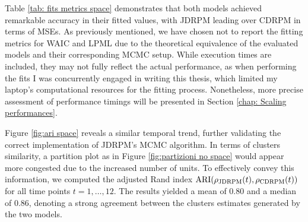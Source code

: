 \documentclass[12pt,	%
	a4paper,		%
	twoside,		%
	openright,		%
	titlepage,%
	]{book}
\theoremstyle{definition}
\begin{document}
Table \ref{tab: fits metrics space} demonstrates that both models achieved remarkable accuracy in their fitted values, with JDRPM leading over CDRPM in terms of MSEs. As previously mentioned, we have chosen not to report the fitting metrics for WAIC and LPML due to the theoretical equivalence of the evaluated models and their corresponding MCMC setup. While execution times are included, they may not fully reflect the actual performance, as when performing the fits I was concurrently engaged in writing this thesis, which limited my laptop's computational resources for the fitting process. Nonetheless, more precise assessment of performance timings will be presented in Section \ref{chap: Scaling performances}.

Figure \ref{fig:ari space} reveals a similar temporal trend, further validating the correct implementation of JDRPM's MCMC algorithm. In terms of clusters similarity, a partition plot as in Figure \ref{fig:partizioni no space} would appear more congested due to the increased number of units. To effectively convey this information, we computed the adjusted Rand index $\operatorname{ARI}(\rho_{\text{JDRPM}}(t),\rho_{\text{CDRPM}}(t))$ for all time points $t=1,\ldots,12$. The results yielded a mean of 0.80 and a median of 0.86, denoting a strong agreement between the clusters estimates generated by the two models.
\end{document}

